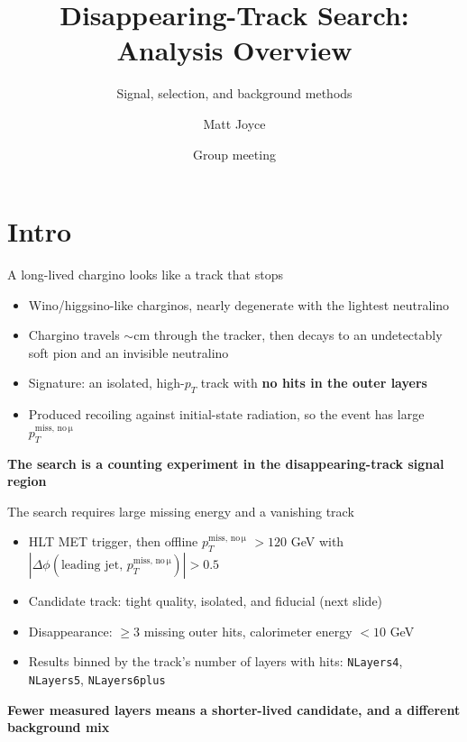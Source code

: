 \documentclass[aspectratio=169,12pt]{beamer}
\title[Disappearing tracks]{Disappearing-Track Search: Analysis Overview}
\subtitle{Signal, selection, and background methods}
\author[M. Joyce]{Matt Joyce}
\institute[OSU]{The Ohio State University}
\date{Group meeting}
\newcommand{\takeaway}[1]{\par\vspace{10pt}\centering\small\textbf{#1}\par}
\newcommand{\ptmiss}{\ensuremath{p_T^{\mathrm{miss,\,no\,\mu}}}}
\begin{document}
\begin{frame}\titlepage\end{frame}

\section{Intro}
\begin{frame}{A long-lived chargino looks like a track that stops}
  \begin{itemize}
    \item Wino/higgsino-like charginos, nearly degenerate with the lightest neutralino
    \item Chargino travels $\sim$cm through the tracker, then decays to an
          undetectably soft pion and an invisible neutralino
    \item Signature: an isolated, high-$p_T$ track with \textbf{no hits in the outer layers}
    \item Produced recoiling against initial-state radiation, so the event has
          large \ptmiss{}
  \end{itemize}
  \takeaway{The search is a counting experiment in the disappearing-track signal region}
\end{frame}

\begin{frame}{The search requires large missing energy and a vanishing track}
  \begin{itemize}
    \item HLT MET trigger, then offline \ptmiss{} $> 120$ GeV with
          $|\Delta\phi(\text{leading jet},\, \ptmiss{})| > 0.5$
    \item Candidate track: tight quality, isolated, and fiducial (next slide)
    \item Disappearance: $\ge 3$ missing outer hits, calorimeter energy $< 10$ GeV
    \item Results binned by the track's number of layers with hits:
          \texttt{NLayers4}, \texttt{NLayers5}, \texttt{NLayers6plus}
  \end{itemize}
  \takeaway{Fewer measured layers means a shorter-lived candidate, and a different background mix}
\end{frame}

\end{document}
